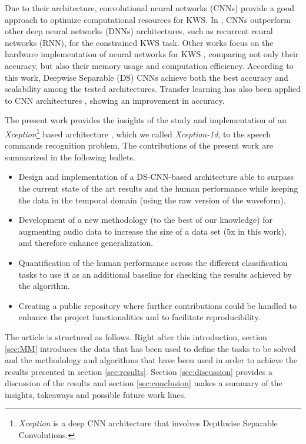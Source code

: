 \documentclass{elsarticle}
\begin{document}
Due to their architecture, convolutional neural networks (CNNs) provide a good approach to optimize computational resources for KWS. In \cite{Tara2015}, CNNs outperform other deep neural networks (DNNs) architectures, such as recurrent reural networks (RNN), for the constrained KWS task. Other works focus on the hardware implementation of neural networks for KWS \cite{Zhang2017}, comparing not only their accuracy, but also their memory usage and computation efficiency. According to this work, Deepwise Separable (DS) CNNs achieve both the best accuracy and scalability among the tested architectures.  Transfer learning has also been applied to CNN architectures \cite{McMahan2018}, showing an improvement in accuracy.

The present work provides the insights of the study and implementation of an \textit{Xception}\footnote{\textit{Xception} is a deep CNN architecture that involves Depthwise Separable Convolutions.} based architecture \cite{FChollet2017}, which we called \textit{Xception-1d}, to the speech commands recognition problem.  The contributions of the present work are summarized in the following bullets.
 
 \begin{itemize}
 	\item Design and implementation of a DS-CNN-based architecture able to surpass the current state of the art results and the human performance while keeping the data in the temporal domain (using the raw version of the waveform).
 	 	
 	\item Development of a new methodology (to the best of our knowledge) for augmenting audio data to increase the size of a data set (5x in this work), and therefore enhance generalization. 
 	
 	\item Quantification of the human performance across the different classification tasks to use it as an additional baseline for checking the results achieved by the algorithm.
 	
	\item Creating a public repository where further contributions could be handled to enhance the project functionalities and to facilitate reproducibility.
 \end{itemize}
 
 The article is structured as follows. Right after this introduction, section \ref{sec:MM} introduces the data that has been used to define the tasks to be solved and the methodology and algorithms that have been used in order to achieve the results presented in section \ref{sec:results}. Section \ref{sec:discussion} provides a discussion of the results and section \ref{sec:conclusion} makes a summary of the insights, takeaways and possible future work lines.
  
\end{document}
